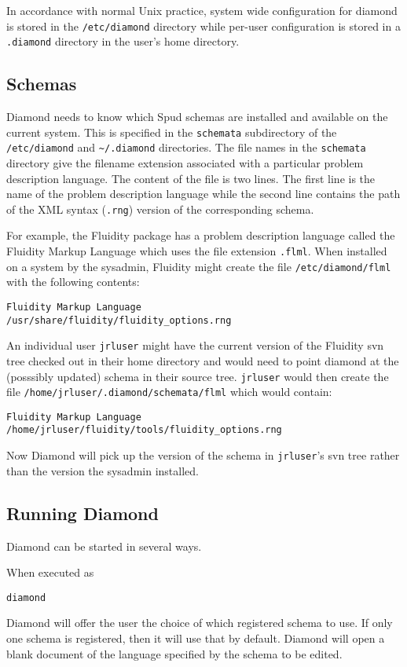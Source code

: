 \documentclass[a4paper, 11pt]{book}
\begin{document}
In accordance with normal Unix practice, system wide configuration for
diamond is stored in the \verb+/etc/diamond+ directory while per-user
configuration is stored in a \verb+.diamond+ directory in the user's home
directory.

\subsection{Schemas}

Diamond needs to know which Spud schemas are installed and available on the
current system. This is specified in the \verb+schemata+ subdirectory of the
\verb+/etc/diamond+ and \verb+~/.diamond+ directories. The file names in the
\verb+schemata+ directory give the filename extension associated with a
particular problem description language. The content of the file is two
lines. The first line is the name of the problem description language while
the second line contains the path of the XML syntax (\verb+.rng+) version of
the corresponding schema.

For example, the Fluidity package has a problem description language called
the Fluidity Markup Language which uses the file extension
\verb+.flml+. When installed on a system by the sysadmin, Fluidity might
create the file \verb+/etc/diamond/flml+ with the following contents:
\begin{verbatim}
Fluidity Markup Language
/usr/share/fluidity/fluidity_options.rng
\end{verbatim}
An individual user \verb+jrluser+ might have the current version of the
Fluidity svn tree checked out in their home directory and would need to
point diamond at the (posssibly updated) schema in their source
tree. \verb+jrluser+ would then create the file
\verb+/home/jrluser/.diamond/schemata/flml+ which would contain:
\begin{verbatim}
Fluidity Markup Language
/home/jrluser/fluidity/tools/fluidity_options.rng
\end{verbatim}
Now Diamond will pick up the version of the schema in \verb+jrluser+'s svn
tree rather than the version the sysadmin installed.

\subsection{Running Diamond}

Diamond can be started in several ways.

When executed as
\begin{verbatim}
diamond
\end{verbatim}
Diamond will offer the user the choice of which registered schema to use.
If only one schema is registered, then it will use that by default.
Diamond will open a blank document of the language specified by the schema to be edited.
\end{document}
